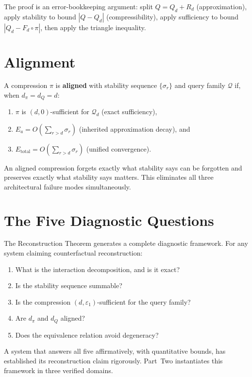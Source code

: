 The proof is an error-bookkeeping argument: split $Q = Q_d + R_d$ (approximation), apply stability to bound $|Q - Q_d|$ (compressibility), apply sufficiency to bound $|Q_d - F_d \circ \pi|$, then apply the triangle inequality.

\section{Alignment}

\begin{definition}
A compression $\pi$ is \textbf{aligned} with stability sequence $\{\sigma_r\}$ and query family $\mathcal{Q}$ if, when $d_\pi = d_Q = d$:
\begin{enumerate}
  \item $\pi$ is $(d, 0)$-sufficient for $\mathcal{Q}_d$ (exact sufficiency),
  \item $E_a = O(\sum_{r>d} \sigma_r)$ (inherited approximation decay), and
  \item $E_{\mathrm{total}} = O(\sum_{r>d} \sigma_r)$ (unified convergence).
\end{enumerate}
\end{definition}

An aligned compression forgets exactly what stability says can be forgotten and preserves exactly what stability says matters. This eliminates all three architectural failure modes simultaneously.

\section{The Five Diagnostic Questions}

The Reconstruction Theorem generates a complete diagnostic framework. For any system claiming counterfactual reconstruction:

\begin{enumerate}
  \item What is the interaction decomposition, and is it exact?
  \item Is the stability sequence summable?
  \item Is the compression $(d, \varepsilon_1)$-sufficient for the query family?
  \item Are $d_\pi$ and $d_Q$ aligned?
  \item Does the equivalence relation avoid degeneracy?
\end{enumerate}

A system that answers all five affirmatively, with quantitative bounds, has established its reconstruction claim rigorously. Part~Two instantiates this framework in three verified domains.
